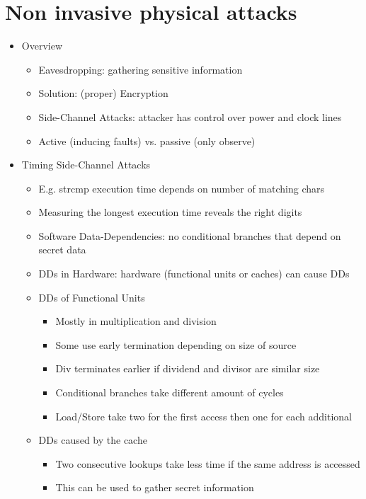 \documentclass[11pt, paper=a4, twocolumn]{scrartcl}
\begin{document}
	\section{Non invasive physical attacks}
		\begin{itemize}
			\item Overview
				\begin{itemize}
					\item Eavesdropping: gathering sensitive information
					\item Solution: (proper) Encryption
					\item Side-Channel Attacks: attacker has control over power and clock lines
					\item Active (inducing faults) vs. passive (only observe)
				\end{itemize}
			\item Timing Side-Channel Attacks
				\begin{itemize}
					\item E.g. strcmp execution time depends on number of matching chars
					\item Measuring the longest execution time reveals the right digits
					\item Software Data-Dependencies: no conditional branches that depend on secret data
					\item DDs in Hardware: hardware (functional units or caches) can cause DDs
					\item DDs of Functional Units
						\begin{itemize}
							\item Mostly in multiplication and division
							\item Some use early termination depending on size of source
							\item Div terminates earlier if dividend and divisor are similar size
							\item Conditional branches take different amount of cycles
							\item Load/Store take two for the first access then one for each additional
						\end{itemize}
					\item DDs caused by the cache
						\begin{itemize}
							\item Two consecutive lookups take less time if the same address is accessed
							\item This can be used to gather secret information
						\end{itemize}

\end{itemize}
\end{itemize}
\end{document}
